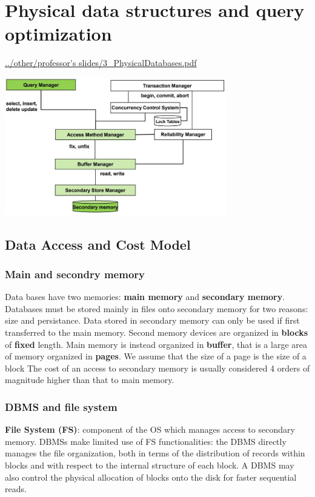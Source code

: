 \section{Physical data structures
and query optimization}
\url{../other/professor's slides/3_PhysicalDatabases.pdf}
\begin{center}
    \includegraphics[height=6cm]{../arguments/Querymanagement.JPG}
\end{center}
\subsection{Data Access and Cost Model}
\subsubsection{Main and secondry memory}
Data bases have two memories: \textbf{main memory} and \textbf{secondary memory}.\newline
\newline
Databases must be stored mainly in files onto secondary memory for two reasons: size and persistance.\newline
\newline
Data stored in secondary memory can only be used if first transferred to the main memory.\newline
\newline
Second memory devices are organized in \textbf{blocks} of \textbf{fixed} length. Main memory is instead organized in \textbf{buffer}, that is a large area of memory organized in \textbf{pages}. We assume that the size of a page is the size of a block\newline
\newline
The cost of an access to secondary memory is usually considered 4 orders of magnitude higher than that to main memory.
\subsubsection{DBMS and file system}
\textbf{File System (FS)}: component of the OS which manages access to secondary memory.\newline
\newline
DBMSs make limited use of FS functionalities: the DBMS directly manages the file organization, both in terms of the distribution of records within blocks and with respect to the internal structure of each block. A DBMS may also control the physical allocation of blocks onto the disk for faster sequential reads.
